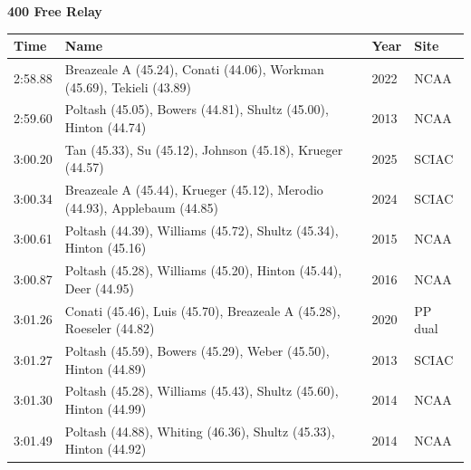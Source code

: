 \noindent\begin{minipage}[t]{0.98\textwidth}
\centering
\textbf{\textcolor{teamprimary}{400 Free Relay}}\par
\vspace{0.5em}
\centering
\small
\renewcommand{\arraystretch}{1.0}
\setlength{\tabcolsep}{4pt}
\begin{tabular}{@{}p{2.7cm}p{4.3cm}p{1.6cm}p{2.7cm}@{}}
\toprule
\textbf{Time} & \textbf{Name} & \textbf{Year} & \textbf{Site} \\
\midrule
2:58.88 & Breazeale A (45.24), Conati (44.06), Workman (45.69), Tekieli (43.89) & 2022 & NCAA \\
2:59.60 & Poltash (45.05), Bowers (44.81), Shultz (45.00), Hinton (44.74) & 2013 & NCAA \\
3:00.20 & Tan (45.33), Su (45.12), Johnson (45.18), Krueger (44.57) & 2025 & SCIAC \\
3:00.34 & Breazeale A (45.44), Krueger (45.12), Merodio (44.93), Applebaum (44.85) & 2024 & SCIAC \\
3:00.61 & Poltash (44.39), Williams (45.72), Shultz (45.34), Hinton (45.16) & 2015 & NCAA \\
3:00.87 & Poltash (45.28), Williams (45.20), Hinton (45.44), Deer (44.95) & 2016 & NCAA \\
3:01.26 & Conati (45.46), Luis (45.70), Breazeale A (45.28), Roeseler (44.82) & 2020 & PP dual \\
3:01.27 & Poltash (45.59), Bowers (45.29), Weber (45.50), Hinton (44.89) & 2013 & SCIAC \\
3:01.30 & Poltash (45.28), Williams (45.43), Shultz (45.60), Hinton (44.99) & 2014 & NCAA \\
3:01.49 & Poltash (44.88), Whiting (46.36), Shultz (45.33), Hinton (44.92) & 2014 & NCAA \\
\bottomrule
\end{tabular}
\end{minipage}
\vspace{1.2em}
